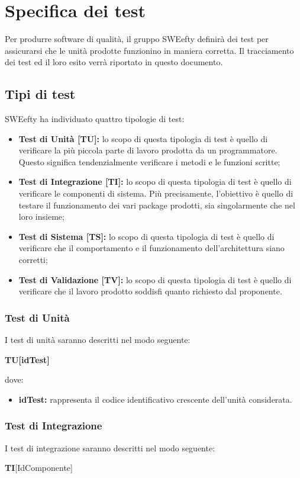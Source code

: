 \section{Specifica dei test}
Per produrre software di qualità, il gruppo SWEefty definirà dei test per assicurarsi che le unità prodotte funzionino in maniera corretta. Il tracciamento dei test ed il loro esito verrà riportato in questo documento.
	\subsection{Tipi di test}
	SWEefty ha individuato quattro tipologie di test:
	\begin{itemize}
		\item {\textbf{Test di Unità [TU]:} lo scopo di questa tipologia di test è quello di verificare la più piccola parte di lavoro prodotta da un programmatore. Questo significa tendenzialmente verificare i metodi e le funzioni scritte; }
		\item {\textbf{Test di Integrazione [TI]:} lo scopo di questa tipologia di test è quello di verificare le componenti di sistema. Più	precisamente, l’obiettivo è quello di testare il funzionamento dei vari package prodotti, sia singolarmente che nel loro insieme; }
		\item {\textbf{Test di Sistema [TS]:} lo scopo di questa tipologia di test è quello di verificare che il comportamento e il funzionamento dell’architettura siano corretti;}
		\item {\textbf{Test di Validazione [TV]:} lo scopo di questa tipologia di test è quello di verificare che il lavoro prodotto soddisfi quanto richiesto dal proponente. }
	\end{itemize} 
		
	\subsubsection{Test di Unità}
	I test di unità saranno descritti nel modo seguente: \Spazio

	\centerline{\textbf{TU[idTest]}}
	
	dove:
	\begin{itemize}
		\item \textbf{idTest:} rappresenta il codice identificativo crescente dell’unità considerata.
	\end{itemize}
	
	\subsubsection{Test di Integrazione}
	I test di integrazione saranno descritti nel modo seguente: \Spazio
	\centerline{\textbf{TI}[IdComponente]}
	
